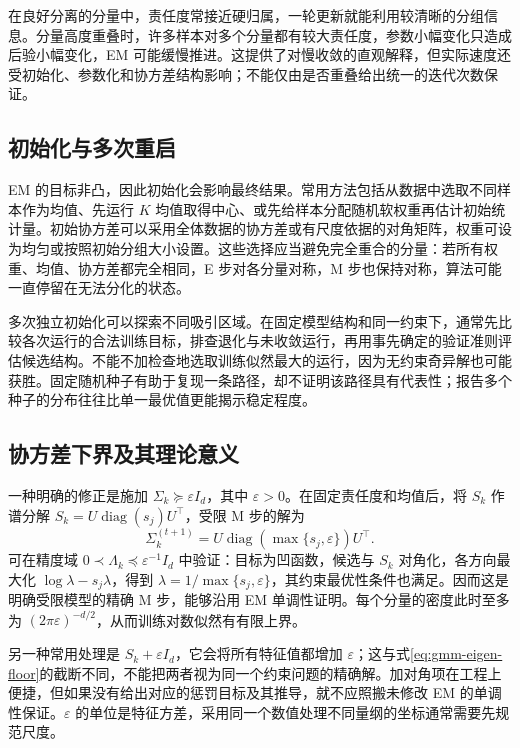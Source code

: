 \documentclass[UTF8]{ctexart}
\begin{document}
在良好分离的分量中，责任度常接近硬归属，一轮更新就能利用较清晰的分组信息。分量高度重叠时，许多样本对多个分量都有较大责任度，参数小幅变化只造成后验小幅变化，EM 可能缓慢推进。这提供了对慢收敛的直观解释，但实际速度还受初始化、参数化和协方差结构影响；不能仅由是否重叠给出统一的迭代次数保证。

\subsection{初始化与多次重启}
EM 的目标非凸，因此初始化会影响最终结果。常用方法包括从数据中选取不同样本作为均值、先运行 $K$ 均值取得中心、或先给样本分配随机软权重再估计初始统计量。初始协方差可以采用全体数据的协方差或有尺度依据的对角矩阵，权重可设为均匀或按照初始分组大小设置。这些选择应当避免完全重合的分量：若所有权重、均值、协方差都完全相同，E 步对各分量对称，M 步也保持对称，算法可能一直停留在无法分化的状态。

多次独立初始化可以探索不同吸引区域。在固定模型结构和同一约束下，通常先比较各次运行的合法训练目标，排查退化与未收敛运行，再用事先确定的验证准则评估候选结构。不能不加检查地选取训练似然最大的运行，因为无约束奇异解也可能获胜。固定随机种子有助于复现一条路径，却不证明该路径具有代表性；报告多个种子的分布往往比单一最优值更能揭示稳定程度。

\subsection{协方差下界及其理论意义}
一种明确的修正是施加 $\Sigma_k\succeq\varepsilon I_d$，其中 $\varepsilon>0$。在固定责任度和均值后，将 $S_k$ 作谱分解 $S_k=U\operatorname{diag}(s_j)U^\top$，受限 M 步的解为
\begin{equation}
\Sigma_k^{(t+1)}=U\operatorname{diag}(\max\{s_j,\varepsilon\})U^\top.
\label{eq:gmm-eigen-floor}
\end{equation}
可在精度域 $0\prec\Lambda_k\preceq\varepsilon^{-1}I_d$ 中验证：目标为凹函数，候选与 $S_k$ 对角化，各方向最大化 $\log\lambda-s_j\lambda$，得到 $\lambda=1/\max\{s_j,\varepsilon\}$，其约束最优性条件也满足。因而这是明确受限模型的精确 M 步，能够沿用 EM 单调性证明。每个分量的密度此时至多为 $(2\pi\varepsilon)^{-d/2}$，从而训练对数似然有有限上界。

另一种常用处理是 $S_k+\varepsilon I_d$，它会将所有特征值都增加 $\varepsilon$；这与式\eqref{eq:gmm-eigen-floor}的截断不同，不能把两者视为同一个约束问题的精确解。加对角项在工程上便捷，但如果没有给出对应的惩罚目标及其推导，就不应照搬未修改 EM 的单调性保证。$\varepsilon$ 的单位是特征方差，采用同一个数值处理不同量纲的坐标通常需要先规范尺度。
\end{document}
